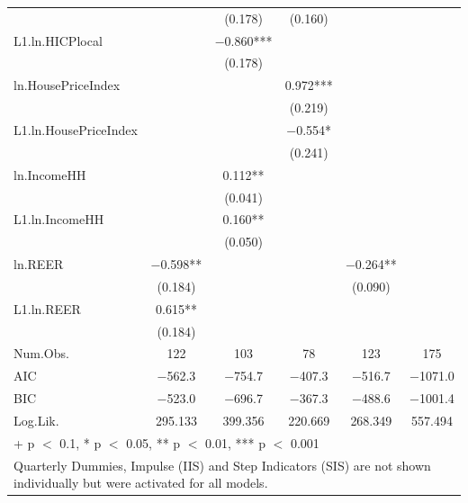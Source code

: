\begin{table}
{\begin{tabular}[t]{lccccc}
 &  & (\num{0.178}) & (\num{0.160}) &  & \\
L1.ln.HICPlocal &  & \num{-0.860}*** &  &  & \\
 &  & (\num{0.178}) &  &  & \\
ln.HousePriceIndex &  &  & \num{0.972}*** &  & \\
 &  &  & (\num{0.219}) &  & \\
L1.ln.HousePriceIndex &  &  & \num{-0.554}* &  & \\
 &  &  & (\num{0.241}) &  & \\
ln.IncomeHH &  & \num{0.112}** &  &  & \\
 &  & (\num{0.041}) &  &  & \\
L1.ln.IncomeHH &  & \num{0.160}** &  &  & \\
 &  & (\num{0.050}) &  &  & \\
ln.REER & \num{-0.598}** &  &  & \num{-0.264}** & \\
 & (\num{0.184}) &  &  & (\num{0.090}) & \\
L1.ln.REER & \num{0.615}** &  &  &  & \\
 & (\num{0.184}) &  &  &  & \\
\midrule
Num.Obs. & \num{122} & \num{103} & \num{78} & \num{123} & \num{175}\\
AIC & \num{-562.3} & \num{-754.7} & \num{-407.3} & \num{-516.7} & \num{-1071.0}\\
BIC & \num{-523.0} & \num{-696.7} & \num{-367.3} & \num{-488.6} & \num{-1001.4}\\
Log.Lik. & \num{295.133} & \num{399.356} & \num{220.669} & \num{268.349} & \num{557.494}\\
\bottomrule
\multicolumn{6}{l}{\rule{0pt}{1em}+ p $<$ 0.1, * p $<$ 0.05, ** p $<$ 0.01, *** p $<$ 0.001}\\
\multicolumn{6}{l}{\rule{0pt}{1em}Quarterly Dummies, Impulse (IIS) and Step Indicators (SIS) are not shown individually but were activated for all models.}\\
\end{tabular}}
\end{table}

